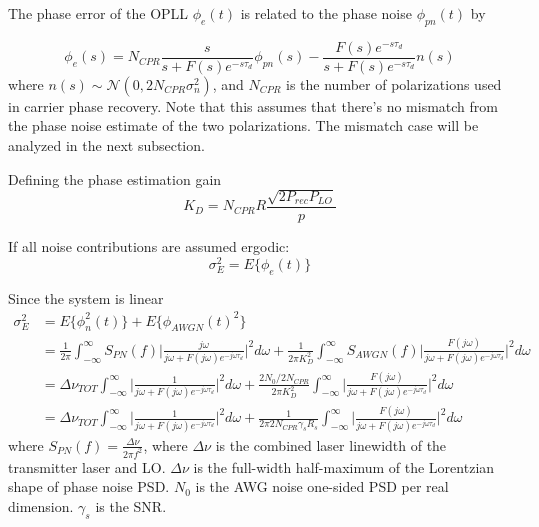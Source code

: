 \documentclass[a4paper]{article}
\begin{document}
The phase error of the OPLL $\phi_e(t)$ is related to the phase noise $\phi_{pn}(t)$ by

\begin{equation}
\phi_e(s) = N_{CPR}\frac{s}{s + F(s)e^{-s\tau_d}}\phi_{pn}(s) - \frac{F(s)e^{-s\tau_d}}{s + F(s)e^{-s\tau_d}}n(s)
\end{equation}
where $n(s) \sim\mathcal{N}(0, 2N_{CPR}\sigma_n^2)$, and $N_{CPR}$ is the number of polarizations used in carrier phase recovery. Note that this assumes that there's no mismatch from the phase noise estimate of the two polarizations. The mismatch case will be analyzed in the next subsection.

Defining the phase estimation gain
\begin{equation}
K_D = N_{CPR}R\frac{\sqrt{2P_{rec}P_{LO}}}{p}
\end{equation}

If all noise contributions are assumed ergodic:
\begin{equation}
\sigma_E^2 = E\{\phi_e(t)\}
\end{equation}

Since the system is linear
\begin{align} \label{eq:phase_error_variance} \nonumber
\sigma_E^2 &= E\{\phi_n^2(t)\} + E\{\phi_{AWGN}(t)^2\} \\ \nonumber
&= \frac{1}{2\pi}\int_{-\infty}^\infty S_{PN}(f)\bigg|\frac{j\omega}{j\omega + F(j\omega)e^{-j\omega\tau_d}}\bigg|^2d\omega + \frac{1}{2\pi K_D^2}\int_{-\infty}^\infty S_{AWGN}(f)\bigg|\frac{F(j\omega)}{j\omega + F(j\omega)e^{-j\omega\tau_d}}\bigg|^2d\omega \\ \nonumber
&= \Delta\nu_{TOT}\int_{-\infty}^\infty \bigg|\frac{1}{j\omega + F(j\omega)e^{-j\omega\tau_d}}\bigg|^2d\omega + \frac{2N_0/2N_{CPR}}{2\pi K_D^2}\int_{-\infty}^\infty \bigg|\frac{F(j\omega)}{j\omega + F(j\omega)e^{-j\omega\tau_d}}\bigg|^2d\omega \\
&= \Delta\nu_{TOT}\int_{-\infty}^\infty \bigg|\frac{1}{j\omega + F(j\omega)e^{-j\omega\tau_d}}\bigg|^2d\omega + \frac{1}{2\pi 2N_{CPR}\gamma_sR_s}\int_{-\infty}^\infty \bigg|\frac{F(j\omega)}{j\omega + F(j\omega)e^{-j\omega\tau_d}}\bigg|^2d\omega 
\end{align}
where $S_{PN}(f) = \frac{\Delta\nu}{2\pi f^2}$, where $\Delta\nu$ is the combined laser linewidth of the transmitter laser and LO.  $\Delta\nu$ is the full-width half-maximum of the Lorentzian shape of phase noise PSD. $N_0$ is the AWG noise one-sided PSD per real dimension. $\gamma_s$ is the SNR.
\end{document}
